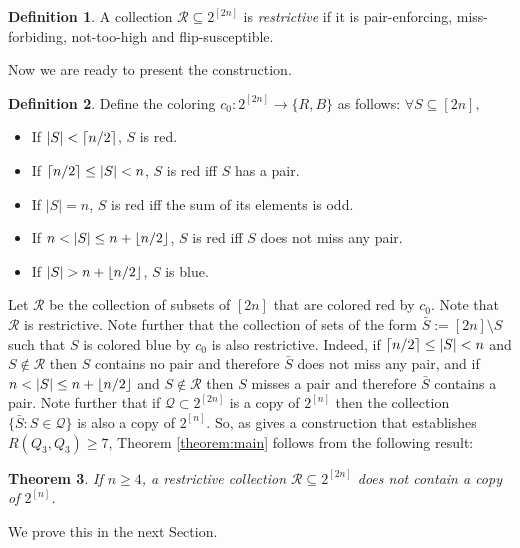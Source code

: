 \documentclass[12pt]{article}
\newtheorem{thm}{Theorem}[section]
\theoremstyle{definition}
\newtheorem{defi}[thm]{Definition}
\newcommand{\R}{\mathcal{R}}
\newcommand{\rb}{\{R,B\}}
\newcommand{\dcube}{2^{[2n]}}
\newcommand{\cube}{2^{[n]}}
\renewcommand{\ss}{S\subseteq [2n]}
\newcommand{\ceilh}{\ceil{n/2}}
\newcommand{\floorh}{\floor{n/2}}
\DeclarePairedDelimiter\ceil{\lceil}{\rceil}
\DeclarePairedDelimiter\floor{\lfloor}{\rfloor}
\begin{document}
\begin{defi}
A collection $\R \subseteq \dcube $ is \textit{restrictive} if it is pair-enforcing, miss-forbiding, not-too-high and flip-susceptible.
\end{defi}

Now we are ready to present the construction.

\begin{defi}\label{definition:coloring}
Define the coloring $c_0:\dcube\to \rb$ as follows: $\forall \ss,$
\begin{itemize}
    \item If $|S|<\ceilh$, $S$ is red.
    \item If $\ceilh\le |S| < n$, $S$ is red iff $S$ has a pair.
    \item If $|S|=n$, $S$ is red iff the sum of its elements is odd.
    \item If $n<|S|\le n+\floorh$, $S$ is red iff $S$ does not miss any pair.
    \item  If $|S|>n+\floorh$, $S$ is blue.
\end{itemize}
\end{defi}

Let $\R$ be the collection of subsets of $ [2n]$ that are colored red by $ c_0$. Note that $\R$ is restrictive. 
Note further that the collection of sets of the form $ \bar{S}:= [2n] \setminus S$ such that $S$ is colored 
blue by $ c_0$ is also restrictive. Indeed, if $\ceilh\le |S| < n$ and $S \not\in \R$ then $S$ contains 
no pair and therefore $ \bar{S} $ does not miss any pair, and if $n<|S|\le n+\floorh$ and $ S \not\in \R$ then $S$ 
misses a pair and therefore $ \bar{S}$ contains a pair.
Note further that if $ \mathcal{Q} \subset \dcube$ is a copy of $\cube$ then the collection $ \{ \bar{S}: S \in \mathcal{Q} \}$ is also a copy of $\cube$. So, as \cite{axenovich2017boolean} gives a construction that establishes $ R( Q_3,Q_3) \ge 7$, 
Theorem \ref{theorem:main} follows from the following result:

\begin{thm}\label{theorem:restrictivenocopy}
If $n\ge 4$, a restrictive collection $ \R \subseteq \dcube$ does not contain a copy of $\cube$.
\end{thm}
We prove this in the next Section.



\end{document}
